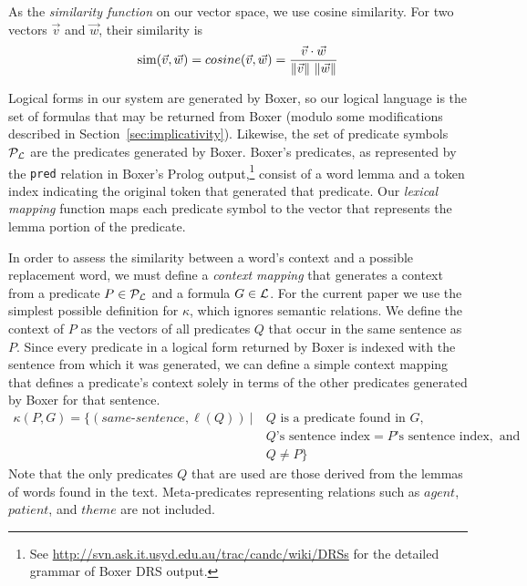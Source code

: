 As the \emph{similarity function} \simfunc on our vector space, we use cosine
similarity. For two vectors $\vec v$ and $\vec w$, their similarity is 
\[ \mathrm{sim}(\vec v, \vec w) = cosine(\vec v, \vec w) = \frac{\vec v \cdot \vec
w}{\|\vec v\|~\|\vec w\|}\]

Logical forms in our system are generated by Boxer, so our logical language
\loglang is the set of formulas that may be returned from Boxer (modulo
some modifications described in Section~\ref{sec:implicativity}).  Likewise, the
set of predicate symbols ${\cal{P}}_{{\cal{L}}}$ are the predicates generated by
Boxer. Boxer's predicates, as represented by the {\tt pred} relation in Boxer's
Prolog output,\footnote{See
\url{http://svn.ask.it.usyd.edu.au/trac/candc/wiki/DRSs} for the detailed
grammar of Boxer DRS output.} consist of a word lemma and a token index
indicating the original token that generated that predicate.  
Our \emph{lexical mapping} function maps each predicate symbol to the
vector that represents the lemma portion of the predicate.

In order to assess the similarity between a word's context and a possible
replacement word, we must define a \textit{context mapping} that generates a
context from a predicate $P \in {\cal{P}}_{{\cal{L}}}$ and a formula $G \in
{\cal{L}}$.  For the current paper we use the simplest possible
definition for $\kappa$, which ignores semantic relations. We define 
the context of $P$ as the
vectors of all predicates $Q$ that occur in the same sentence as $P$.
Since every predicate in a logical form returned by Boxer is indexed
with the sentence from which it was generated, we can define a simple context
mapping that defines a predicate's context solely in terms of the other
predicates generated by Boxer for that sentence.
\begin{align*}
\kappa(P,G) = \{ (same\text{-}sentence, \ell(Q)) ~|
&~Q \text{ is a predicate found in } G, \\
&~Q\text{'s sentence index} = P\text{'s sentence index}, \text{ and } \\
&~Q \neq P \}
\end{align*}
Note that the only predicates $Q$ that are used are those derived from the
lemmas of words found in the text.  Meta-predicates representing relations such
as $agent$, $patient$, and $theme$ are not included.

